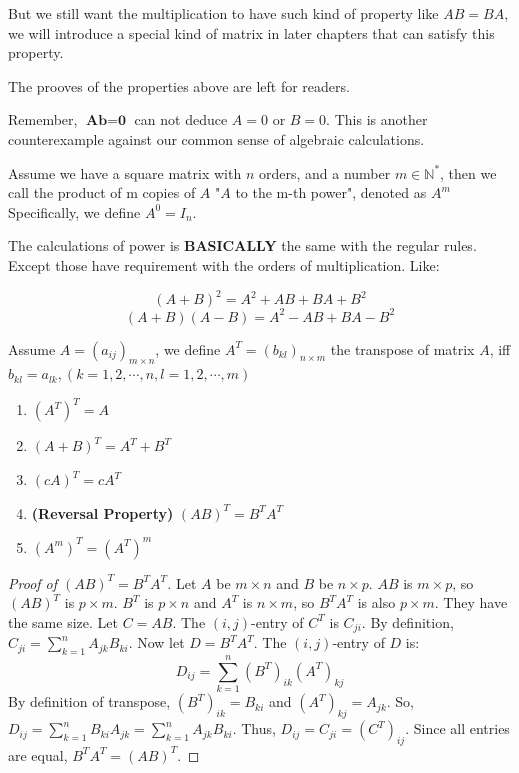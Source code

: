 But we still want the multiplication to have such kind of property like $AB = BA$, we will introduce a special kind of matrix in later chapters that can satisfy this property.

The prooves of the properties above are left for readers.

\begin{remark}
Remember, $\textbf{A} \textbf{b} = \textbf{0}$ can not deduce $A=0$ or $B=0$. This is another counterexample against our common sense of algebraic calculations.
\end{remark}

\begin{definition}
Assume we have a square matrix with $n$ orders, and a number $m \in \mathbb{N}^{*}$, then we call the product of m copies of $A$ "$A$ to the m-th power", denoted as $A^m$
Specifically, we define $A^0 = I_n$.
\end{definition}

The calculations of power is \textbf{BASICALLY} the same with the regular rules. Except those have requirement with the orders of multiplication. Like:

\[(A+B)^2 = A^2 + AB + BA + B^2\]
\[(A+B)(A-B) = A^2 - AB + BA - B^2\]

\begin{definition}
Assume $A=(a_{ij})_{m \times n}$, we define $A^T=(b_{kl})_{n \times m}$ the transpose of matrix $A$, iff $b_{kl} = a_{lk}, (k=1,2,\cdots,n,l=1,2,\cdots,m)$
\end{definition}

\begin{property}
\begin{enumerate}
    \item $(A^T)^T = A$
    \item $(A+B)^T = A^T + B^T$
    \item $(cA)^T = cA^T$
    \item \textbf{(Reversal Property)} $(AB)^T = B^T A^T$
    \item $(A^m)^T = (A^T)^m$
\end{enumerate}
\end{property}
\begin{proof}[Proof of $(AB)^T = B^T A^T$]
Let $A$ be $m \times n$ and $B$ be $n \times p$. $AB$ is $m \times p$, so $(AB)^T$ is $p \times m$.
$B^T$ is $p \times n$ and $A^T$ is $n \times m$, so $B^T A^T$ is also $p \times m$. They have the same size.
Let $C = AB$. The $(i, j)$-entry of $C^T$ is $C_{ji}$.
By definition, $C_{ji} = \sum_{k=1}^n A_{jk} B_{ki}$.
Now let $D = B^T A^T$. The $(i, j)$-entry of $D$ is:
\[ D_{ij} = \sum_{k=1}^n (B^T)_{ik} (A^T)_{kj} \]
By definition of transpose, $(B^T)_{ik} = B_{ki}$ and $(A^T)_{kj} = A_{jk}$.
So, $D_{ij} = \sum_{k=1}^n B_{ki} A_{jk} = \sum_{k=1}^n A_{jk} B_{ki}$.
Thus, $D_{ij} = C_{ji} = (C^T)_{ij}$. Since all entries are equal, $B^T A^T = (AB)^T$.
\end{proof}

